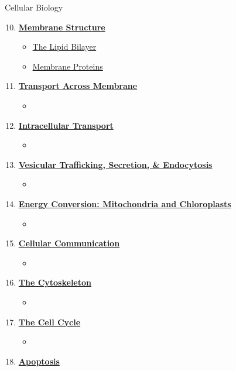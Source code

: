 \documentclass[12pt,letterpaper]{article}
\begin{document}
\begin{contbox}{Cellular Biology}{ 
\begin{enumerate}[font=\bfseries, wide]
    \setcounter{enumi}{9}
    \item \hyperlink{10}{\textbf{Membrane Structure}}
    \begin{itemize}
        \item \hyperlink{10.1a}{The Lipid Bilayer}
        \item \hyperlink{10.2a}{Membrane Proteins}
    \end{itemize}
    \item \hyperlink{11}{\textbf{Transport Across Membrane}}
    \begin{itemize}
        \item
    \end{itemize}
    \item \hyperlink{12}{\textbf{Intracellular Transport}}
    \begin{itemize}
        \item 
    \end{itemize}
    \item \hyperlink{13}{\textbf{Vesicular Trafficking, Secretion, \& Endocytosis}}
    \begin{itemize}
        \item
    \end{itemize}
    \item \hyperlink{14}{\textbf{Energy Conversion: Mitochondria and Chloroplasts}}
    \begin{itemize}
        \item 
    \end{itemize}
    \item \hyperlink{15}{\textbf{Cellular Communication}}
    \begin{itemize}
        \item 
    \end{itemize}
    \item \hyperlink{16}{\textbf{The Cytoskeleton}}
    \begin{itemize}
        \item 
    \end{itemize}
    \item \hyperlink{17}{\textbf{The Cell Cycle}}
    \begin{itemize}
        \item 
    \end{itemize}
    \item \hyperlink{18}{\textbf{Apoptosis}}
    \begin{itemize}

\end{itemize}
\end{enumerate}}
\end{contbox}
\end{document}
